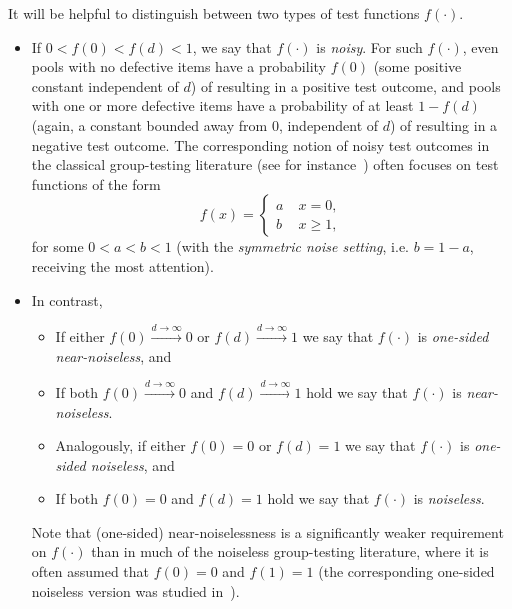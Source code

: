 \documentclass[onecolumn,letterpaper]{IEEEtran}
\begin{document}
{
It will be helpful to distinguish between two types of test functions $f(\cdot)$.
\begin{itemize}
    \item If $0 < f(0) < f(d) < 1$,  we say that $f(\cdot)$ is {\it noisy}. %
    For such $f(\cdot)$, even pools with no defective items have a probability $f(0)$ (some positive constant independent of $d$) of resulting in a positive test outcome, and pools with one or more defective items  have a probability of at least $1-f(d)$ (again, a constant bounded away from $0$, independent of $d$) of resulting in a negative test outcome. The corresponding notion of noisy test outcomes in the classical group-testing literature (see for instance~\cite{scarlett2018near}) often focuses on test functions of the form \begin{equation}
        \label{f(x)_classical_noisy}
    f(x)= 
    \left\{
    \begin{array}{cc}
    a& \; x = 0, \\
    b     &  \; x \geq 1,
    \end{array} 
    \right.
    \end{equation}
    for some $0 < a < b < 1$ (with the {\it symmetric noise setting}, i.e. $b = 1-a$, receiving the most attention). 
    \item In contrast, \begin{itemize}
        \item If either $ f(0) \xrightarrow{d\rightarrow \infty} 0$ or $f(d) \xrightarrow{d\rightarrow \infty} 1$  we say that $f(\cdot)$ is {\it one-sided near-noiseless}, and
        \item If both $ f(0) \xrightarrow{d\rightarrow \infty} 0$ and $f(d) \xrightarrow{d\rightarrow \infty} 1$ hold we say that $f(\cdot)$ is {\it near-noiseless}.
        \item Analogously, if either $ f(0) = 0$ or $f(d) = 1$ we say that $f(\cdot)$ is {\it one-sided noiseless}, and
        \item If both $ f(0) = 0$ and $f(d) = 1$ hold we say that $f(\cdot)$ is {\it noiseless}. 
    \end{itemize}
 Note that (one-sided) near-noiselessness is a significantly weaker requirement on $f(\cdot)$ than in much of the noiseless group-testing literature, where it is often assumed that $f(0) = 0$ and $f(1) = 1$ (the corresponding one-sided noiseless version was studied in~\cite{scarlett2020noisy}).
\end{itemize}
}
\end{document}
